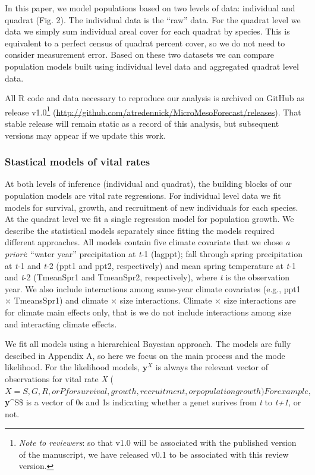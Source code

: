 \documentclass[12pt,]{article}
\begin{document}
In this paper, we model populations based on two levels of data:
individual and quadrat (Fig. 2). The individual data is the ``raw''
data. For the quadrat level we data we simply sum individual areal cover
for each quadrat by species. This is equivalent to a perfect census of
quadrat percent cover, so we do not need to consider measurement error.
Based on these two datasets we can compare population models built using
individual level data and aggregated quadrat level data.

All R code and data necessary to reproduce our analysis is archived on
GitHub as release v1.0\footnote{\emph{Note to reviewers}: so that v1.0
  will be associated with the published version of the manuscript, we
  have released v0.1 to be associated with this review version.}
(\url{http://github.com/atredennick/MicroMesoForecast/releases}). That
stable release will remain static as a record of this analysis, but
subsequent versions may appear if we update this work.

\subsubsection{Stastical models of vital
rates}\label{stastical-models-of-vital-rates}

At both levels of inference (individual and quadrat), the building
blocks of our population models are vital rate regressions. For
individual level data we fit models for survival, growth, and
recruitment of new individuals for each species. At the quadrat level we
fit a single regression model for population growth. We describe the
statistical models separately since fitting the models required
different approaches. All models contain five climate covariate that we
chose \emph{a priori}: ``water year'' precipitation at \emph{t}-1
(lagppt); fall through spring precipitation at \emph{t}-1 and \emph{t}-2
(ppt1 and ppt2, respectively) and mean spring temperature at \emph{t}-1
and \emph{t}-2 (TmeanSpr1 and TmeanSpr2, respectively), where \emph{t}
is the observation year. We also include interactions among same-year
climate covariates (e.g., ppt1 $\times$ TmeansSpr1) and climate $\times$
size interactions. Climate $\times$ size interactions are for climate
main effects only, that is we do not include interactions among size and
interacting climate effects.

We fit all models using a hierarchical Bayesian approach. The models are
fully descibed in Appendix A, so here we focus on the main process and
the mode likelihood. For the likelihood models, $\textbf{y}^X$ is always
the relevant vector of observations for vital rate \emph{X}
($X = S, G, R, or P for survival, growth, recruitment, or population growth) For example, $\textbf{y}\^{}S\$
is a vector of 0s and 1s indicating whether a genet surives from
\emph{t} to \emph{t+1}, or not.
\end{document}
